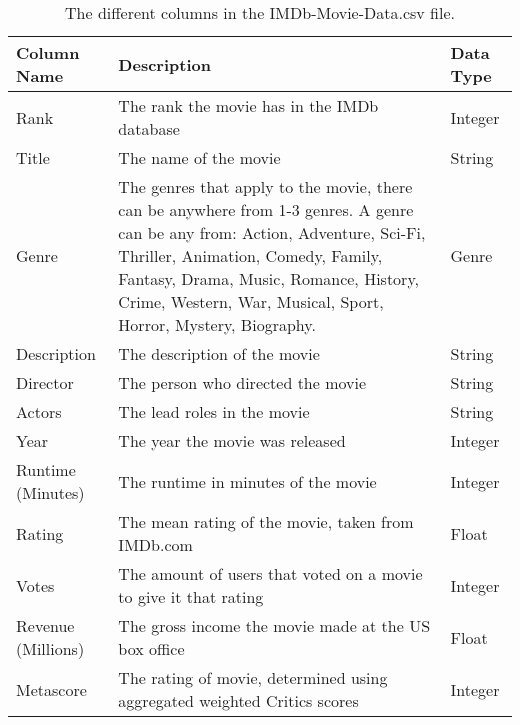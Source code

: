     \begin{table}[h]
        \centering
        \begin{tabular}{lp{10cm}l}
            \toprule
            Column Name        & Description                                                                & Data Type \\
            \midrule
            Rank               & The rank the movie has in the IMDb database                                & Integer   \\
            Title              & The name of the movie                                                      & String    \\
            Genre              & The genres that apply to the movie, there can be anywhere from 1-3 genres.
            A genre can be any from: Action, Adventure, Sci-Fi, Thriller, Animation,
                Comedy, Family, Fantasy, Drama, Music, Romance, History, Crime, Western, War,
                Musical, Sport, Horror, Mystery, Biography.
                               & Genre                                                                                  \\
            Description        & The description of the movie                                               & String    \\
            Director           & The person who directed the movie                                          & String    \\
            Actors             & The lead roles in the movie                                                & String    \\
            Year               & The year the movie was released                                            & Integer   \\
            Runtime (Minutes)  & The runtime in minutes of the movie                                        & Integer   \\
            Rating             & The mean rating of the movie, taken from IMDb.com                          & Float     \\
            Votes              & The amount of users that voted on a movie to give it that rating           & Integer   \\
            Revenue (Millions) & The gross income the movie made at the US box office                       & Float     \\
            Metascore          & The rating of movie, determined using aggregated weighted Critics scores   & Integer   \\
            \bottomrule
        \end{tabular}
        \caption[short]{The different columns in the IMDb-Movie-Data.csv file.}\label{tab-IMDb-Movie-Data-Column-Description}
    \end{table}

